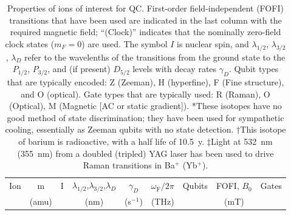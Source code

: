 \documentclass[%
12pt,
 amsmath,amssymb,
]{revtex4-2}
\begin{document}
\begin{table}[t b h !]
\caption{Properties of ions of interest for QC.  First-order field-independent (FOFI) transitions that have been used are indicated in the last column with the required magnetic field; ``(Clock)'' indicates that the nominally zero-field clock states ($m_F=0$) are used.  The symbol $I$ is nuclear spin, and $\lambda_{1/2}$, $\lambda_{3/2}$, $\lambda_{D}$ refer to the wavelenths of the transitions from the ground state to the $P_{1/2}$, $P_{3/2}$, and (if present) $D_{5/2}$ levels with decay rates $\gamma_{D}$.  Qubit types that are typically encoded:  Z (Zeeman), H (hyperfine), F (Fine structure), and O (optical).  Gate types that are typically used:  R (Raman), O (Optical), M (Magnetic [AC or static gradient]).  *These isotopes have no good method of state discrimination; they have been used for sympathetic cooling, essentially as Zeeman qubits with no state detection.  $\dagger$This isotope of barium is radioactive, with a half life of 10.5~y. $\ddagger$Light at 532~nm (355~nm) from a doubled (tripled) YAG laser has been used to drive Raman transitions in Ba$^{+}$ (Yb$^{+}$).}
\begin{ruledtabular}
\begin{tabular}{ccccccccc}

Ion  & m  & I & $\lambda_{1/2}$,$\lambda_{3/2}$,$\lambda_{D}$  & $\gamma_{D}$ & $\omega_{\textrm{F}}/2\pi$  & Qubits  & FOFI, $B_0$ & Gates \\
  & (amu) &  &  (nm)  &  (s$^{-1}$)  & (THz)  &     & (mT) &  \\
\hline


\end{tabular}
\end{ruledtabular}
\end{table}
\end{document}
